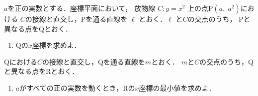 ﻿\documentclass[../../../uem_tok_q.tex]{subfiles}
\begin{document}
    $a$を正の実数とする．座標平面において，%
    放物線 $C\colon y=x^2$ 上の点P$(a,\;a^2)$における%
    $C$の接線と直交し，Pを通る直線を $\ell$ とおく．$\ell$ と$C$の交点のうち，%
    Pと異なる点をQとおく．

    \begin{enumerate}
        \item Qの$x$座標を求めよ．
    \end{enumerate}

    Qにおける$C$の接線と直交し，Qを通る直線を$m$とおく．%
    $m$と$C$の交点のうち，Qと異なる点をRとおく．

    \begin{enumerate}[resume]
        \item $a$がすべての正の実数を動くとき，Rの$x$座標の最小値を求めよ．
    \end{enumerate}
\end{document}
